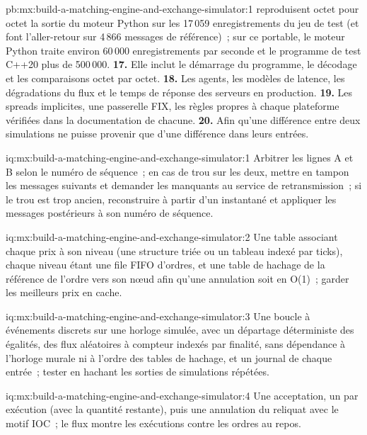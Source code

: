 \begin{solution}{pb:mx:build-a-matching-engine-and-exchange-simulator:1}
reproduisent octet pour octet la sortie du moteur Python sur les 17\,059 enregistrements du jeu de test (et font l'aller-retour sur 4\,866 messages de référence)~; sur ce portable, le moteur Python
traite environ 60\,000 enregistrements par seconde et le programme de test C++20 plus de 500\,000.
\textbf{17.} Elle inclut le démarrage du programme, le décodage et les comparaisons octet par octet.
\textbf{18.} Les agents, les modèles de latence, les dégradations du flux et le temps de réponse des serveurs en production.
\textbf{19.} Les spreads implicites, une passerelle FIX, les règles propres à chaque plateforme vérifiées dans la documentation de chacune.
\textbf{20.} Afin qu'une différence entre deux simulations ne puisse provenir que d'une différence dans leurs entrées.
\end{solution}

\begin{solution}{iq:mx:build-a-matching-engine-and-exchange-simulator:1}
Arbitrer les lignes A et B selon le numéro de séquence~; en cas de trou sur les deux, mettre en tampon les messages suivants et demander les manquants au service de retransmission~; si
le trou est trop ancien, reconstruire à partir d'un instantané et appliquer les messages postérieurs à son numéro de séquence.
\end{solution}

\begin{solution}{iq:mx:build-a-matching-engine-and-exchange-simulator:2}
Une table associant chaque prix à son niveau (une structure triée ou un tableau indexé par ticks), chaque niveau étant une file FIFO d'ordres, et une table de hachage de la référence de l'ordre vers son nœud
afin qu'une annulation soit en O(1)~; garder les meilleurs prix en cache.
\end{solution}

\begin{solution}{iq:mx:build-a-matching-engine-and-exchange-simulator:3}
Une boucle à événements discrets sur une horloge simulée, avec un départage déterministe des égalités, des flux aléatoires à compteur indexés par finalité, sans dépendance à l'horloge murale ni
à l'ordre des tables de hachage, et un journal de chaque entrée~; tester en hachant les sorties de simulations répétées.
\end{solution}

\begin{solution}{iq:mx:build-a-matching-engine-and-exchange-simulator:4}
Une acceptation, un  par exécution (avec la quantité restante), puis une annulation du reliquat avec le motif IOC~; le flux montre les exécutions contre
les ordres au repos.
\end{solution}

